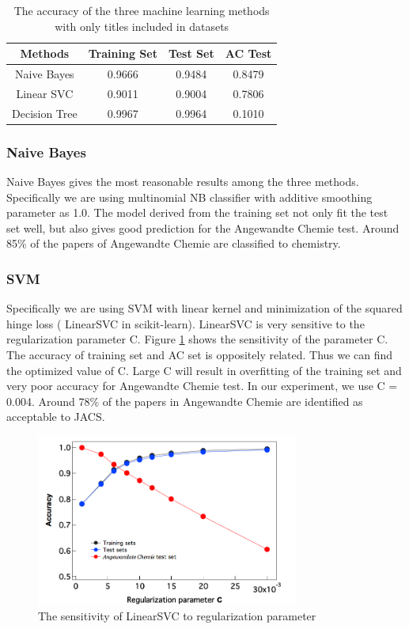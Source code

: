 \documentclass[conference]{IEEEtran}
\begin{document}
\begin{table}
    \caption{The accuracy of the three machine learning methods with only titles included in datasets\label{tab:acc-title}}
    \begin{center}
        \begin{tabular}{c | c | c | c}
            \hline
            \bf{Methods} & \bf{Training Set} & \bf{Test Set} & \bf{AC Test} \\
            \hline
            Naive Bayes & 0.9666 & 0.9484 & 0.8479 \\
            \hline
            Linear SVC & 0.9011 & 0.9004 & 0.7806 \\
            \hline
            Decision Tree & 0.9967 & 0.9964 & 0.1010 \\
            \hline
        \end{tabular}
    \end{center}
\end{table}

\subsubsection{Naive Bayes}
Naive Bayes gives the most reasonable results among the three methods. Specifically we are using multinomial NB classifier with additive smoothing parameter as 1.0. The model derived from the training set not only fit the test set well, but also gives good prediction for the Angewandte Chemie test. Around 85\% of the papers of Angewandte Chemie are classified to chemistry.

\subsubsection{SVM}
Specifically we are using SVM with linear kernel and minimization of the squared hinge loss ( LinearSVC in scikit-learn). LinearSVC is very sensitive to the regularization parameter C. Figure \ref{fig:sensitivity} shows the sensitivity of the parameter C. The accuracy of training set and AC set is oppositely related. Thus we can find the optimized value of C. Large C will result in overfitting of the training set and very poor accuracy for Angewandte Chemie test. In our experiment, we use C = 0.004. Around 78\% of the papers in Angewandte Chemie are identified as acceptable to JACS.

\begin{figure}[!t]
\centering
\includegraphics[width=3.4in]{SVM_C}
\caption{The sensitivity of LinearSVC to regularization parameter}
\label{fig:sensitivity}
\end{figure}
\end{document}
